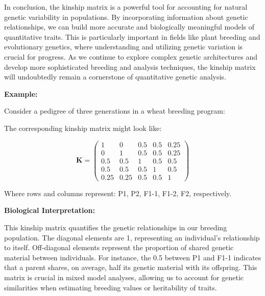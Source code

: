 \documentclass[12pt,a4paper]{article}
\newenvironment{example}[1][]
{\begin{basebox}[linecolor=uqgold]
\textbf{\color{uqgold}Example:} \textit{#1}\par\noindent\ignorespaces}
{\end{basebox}}
\newenvironment{interpretation}[1][]
{\begin{basebox}[linecolor=uqgreen]
\textbf{\color{uqgreen}Biological Interpretation:} \textit{#1}\par\noindent\ignorespaces}
{\end{basebox}}
\begin{document}
In conclusion, the kinship matrix is a powerful tool for accounting for natural genetic variability in populations. By incorporating information about genetic relationships, we can build more accurate and biologically meaningful models of quantitative traits. This is particularly important in fields like plant breeding and evolutionary genetics, where understanding and utilizing genetic variation is crucial for progress. As we continue to explore complex genetic architectures and develop more sophisticated breeding and analysis techniques, the kinship matrix will undoubtedly remain a cornerstone of quantitative genetic analysis.

\begin{example}
Consider a pedigree of three generations in a wheat breeding program:


The corresponding kinship matrix might look like:

\[
\mathbf{K} = \begin{pmatrix}
    1   & 0   & 0.5 & 0.5 & 0.25 \\
    0   & 1   & 0.5 & 0.5 & 0.25 \\
    0.5 & 0.5 & 1   & 0.5 & 0.5  \\
    0.5 & 0.5 & 0.5 & 1   & 0.5  \\
    0.25& 0.25& 0.5 & 0.5 & 1
\end{pmatrix}
\]

Where rows and columns represent: P1, P2, F1-1, F1-2, F2, respectively.
\end{example}

\begin{interpretation}
This kinship matrix quantifies the genetic relationships in our breeding population. The diagonal elements are 1, representing an individual's relationship to itself. Off-diagonal elements represent the proportion of shared genetic material between individuals. For instance, the 0.5 between P1 and F1-1 indicates that a parent shares, on average, half its genetic material with its offspring. This matrix is crucial in mixed model analyses, allowing us to account for genetic similarities when estimating breeding values or heritability of traits.
\end{interpretation}
\end{document}
